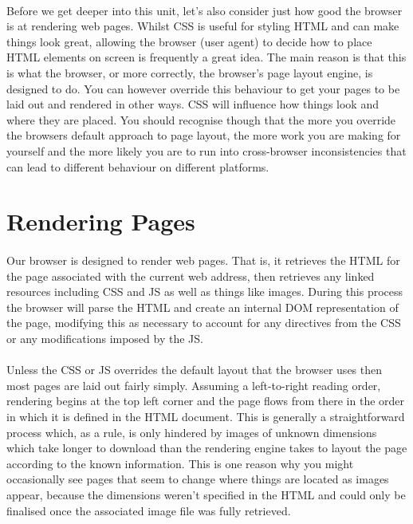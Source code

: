 \paragraph{} Before we get deeper into this unit, let's also consider just how good the browser is at rendering web pages. Whilst CSS is useful for styling HTML and can make things look great, allowing the browser (user agent) to decide how to place HTML elements on screen is frequently a great idea. The main reason is that this is what the browser, or more correctly, the browser's page layout engine, is designed to do. You can however override this behaviour to get your pages to be laid out and rendered in other ways. CSS will influence how things look and where they are placed. You should recognise though that the more you override the browsers default approach to page layout, the more work you are making for yourself and the more likely you are to run into cross-browser inconsistencies that can lead to different behaviour on different platforms.


\section{Rendering Pages}
\paragraph{} Our browser is designed to render web pages. That is, it retrieves the HTML for the page associated with the current web address, then retrieves any linked resources including CSS and JS as well as things like images. During this process the browser will parse the HTML and create an internal DOM representation of the page, modifying this as necessary to account for any directives from the CSS or any modifications imposed by the JS. 
\paragraph{} Unless the CSS or JS overrides the default layout that the browser uses then most pages are laid out fairly simply. Assuming a left-to-right reading order, rendering begins at the top left corner and the page flows from there in the order in which it is defined in the HTML document. This is generally a straightforward process which, as a rule, is only hindered by images of unknown dimensions which take longer to download than the rendering engine takes to layout the page according to the known information. This is one reason why you might occasionally see pages that seem to change where things are located as images appear, because the dimensions weren't specified in the HTML and could only be finalised once the associated image file was fully retrieved.
